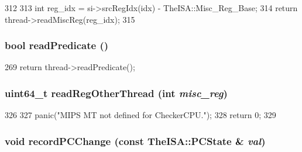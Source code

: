 \begin{DoxyCode}
312     {
313         int reg_idx = si->srcRegIdx(idx) - TheISA::Misc_Reg_Base;
314         return thread->readMiscReg(reg_idx);
315     }
\end{DoxyCode}
\hypertarget{classCheckerCPU_a254cecc48d457ea298b08a8bb009f9cf}{
\subsubsection[{readPredicate}]{\setlength{\rightskip}{0pt plus 5cm}bool readPredicate ()}}
\label{classCheckerCPU_a254cecc48d457ea298b08a8bb009f9cf}



\begin{DoxyCode}
269 { return thread->readPredicate(); }
\end{DoxyCode}
\hypertarget{classCheckerCPU_a77cf978e7a92e33083fcc62cb7ead74d}{
\subsubsection[{readRegOtherThread}]{\setlength{\rightskip}{0pt plus 5cm}uint64\_\-t readRegOtherThread (int {\em misc\_\-reg})}}
\label{classCheckerCPU_a77cf978e7a92e33083fcc62cb7ead74d}



\begin{DoxyCode}
326     {
327         panic("MIPS MT not defined for CheckerCPU.\n");
328         return 0;
329     }
\end{DoxyCode}
\hypertarget{classCheckerCPU_a24cf06d21848d1a0b10efd6f1571d729}{
\subsubsection[{recordPCChange}]{\setlength{\rightskip}{0pt plus 5cm}void recordPCChange (const TheISA::PCState \& {\em val})}}
\label{classCheckerCPU_a24cf06d21848d1a0b10efd6f1571d729}



